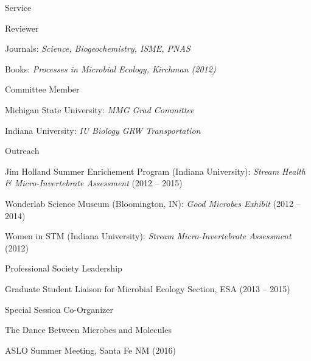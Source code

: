 \documentclass{resume} %
\begin{document}
\begin{rSection}{Service}

    \begin{rSubsection}{Reviewer}{}{}{}
        \item Journals: {\em Science, Biogeochemistry, ISME, PNAS}
        \item Books: {\em Processes in Microbial Ecology, Kirchman (2012)}
    \end{rSubsection}

    \begin{rSubsection}{Committee Member}{}{}{}
        \item Michigan State University: {\em MMG Grad Committee}
        \item Indiana University: {\em IU Biology GRW Transportation}
    \end{rSubsection}

    \begin{rSubsection}{Outreach}{}{}{}
        \item Jim Holland Summer Enrichement Program (Indiana University):
        {\em Stream Health \& Micro-Invertebrate Assessment} (2012 -- 2015)
        \item Wonderlab Science Museum (Bloomington, IN): {\em Good Microbes
        Exhibit} (2012 -- 2014)
        \item Women in STM (Indiana University): {\em Stream Micro-Invertebrate
        Assessment} (2012)
    \end{rSubsection}

    \begin{rSubsection}{Professional Society Leadership}{}{}{}
        \item Graduate Student Liaison for Microbial Ecology Section, ESA
              (2013 -- 2015)
    \end{rSubsection}

    \begin{rSubsection}{Special Session Co-Organizer}{}{}{}
        \item The Dance Between Microbes and Molecules
				\item ASLO Summer Meeting, Santa Fe NM (2016)
    \end{rSubsection}


\end{rSection}
\end{document}
